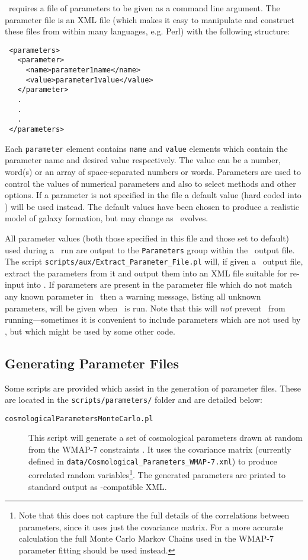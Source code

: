 \glc\ requires a file of parameters to be given as a command line argument. The parameter file is an XML file (which makes it easy to manipulate and construct these files from within many languages, e.g. Perl) with the following structure:
\begin{verbatim}
 <parameters>
   <parameter>
     <name>parameter1name</name>
     <value>parameter1value</value>
   </parameter>
   .
   .
   .
 </parameters>
\end{verbatim}
Each {\tt parameter} element contains {\tt name} and {\tt value} elements which contain the parameter name and desired value respectively. The value can be a number, word(s) or an array of space-separated numbers or words. Parameters are used to control the values of numerical parameters and also to select methods and other options. If a parameter is not specified in the file a default value (hard coded into \glc) will be used instead. The default values have been chosen to produce a realistic model of galaxy formation, but may change as \glc\ evolves.

All parameter values (both those specified in this file and those set to default) used during a \glc\ run are output to the {\tt Parameters} group within the \glc\ output file. The script {\tt scripts/aux/Extract\_Parameter\_File.pl} will, if given a \glc\ output file, extract the parameters from it and output them into an XML file suitable for re-input into \glc. If parameters are present in the parameter file which do not match any known parameter in \glc\ then a warning message, listing all unknown parameters, will be given when \glc\ is run. Note that this will \emph{not} prevent \glc\ from running---sometimes it is convenient to include parameters which are not used by \glc, but which might be used by some other code.

\subsection{Generating Parameter Files}

Some scripts are provided which assist in the generation of parameter files. These are located in the {\tt scripts/parameters/} folder and are detailed below:
\begin{description}
\item [{\tt cosmologicalParametersMonteCarlo.pl}] This script will generate a set of cosmological parameters drawn at random from the WMAP-7 constraints \cite{komatsu_seven-year_2010}. It uses the covariance matrix (currently defined in {\tt data/Cosmological\_Parameters\_WMAP-7.xml}) to produce correlated random variables\footnote{Note that this does not capture the full details of the correlations between parameters, since it uses just the covariance matrix. For a more accurate calculation the full Monte Carlo Markov Chains used in the WMAP-7 parameter fitting should be used instead.}. The generated parameters are printed to standard output as \glc-compatible XML.
\end{description}

